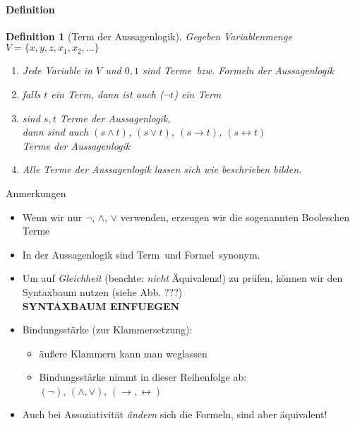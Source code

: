 \paragraph{Definition}
\newtheorem{defi}{Definition}
\begin{defi}[Term der Aussagenlogik]
Gegeben Variablenmenge $V = \{ x,y,z,x_1,x_2, ...\} $
\begin{enumerate}
\item Jede Variable in $V$ und $0,1$ sind \glq Terme\grq\ bzw. Formeln der Aussagenlogik
\item falls $t$ ein Term, dann ist auch ($\neg t$) ein Term
\item sind $s,t$ Terme der Aussagenlogik, \\
dann sind auch $(s \land t)$, $(s \lor t)$, $(s\rightarrow t)$, $(s\leftrightarrow t)$ \\
Terme der Aussagenlogik
\item Alle Terme der Aussagenlogik lassen sich wie beschrieben bilden.
\end{enumerate}
\end{defi}
%
Anmerkungen
\begin{itemize}
\item Wenn wir nur $\neg$, $\land$, $\lor$ verwenden, erzeugen wir die sogenannten \glq Booleschen Terme\grq
\item In der Aussagenlogik sind \glq Term\grq\ und \glq Formel\grq\ synonym.
\item Um auf \emph{Gleichheit} (beachte: \emph{nicht} Äquivalenz!) zu prüfen, können wir den Syntaxbaum nutzen (siehe Abb. ???)
\\ \textbf{SYNTAXBAUM EINFUEGEN}
\item Bindungsstärke (zur Klammersetzung):
\begin{itemize}
\item äußere Klammern kann man weglassen
\item Bindungsstärke nimmt in dieser Reihenfolge ab: \\
$(\neg)$, $(\land,\lor)$, $(\rightarrow, \leftrightarrow)$
\end{itemize}
\item Auch bei Assoziativität \emph{ändern} sich die Formeln, sind aber äquivalent!
\end{itemize}
